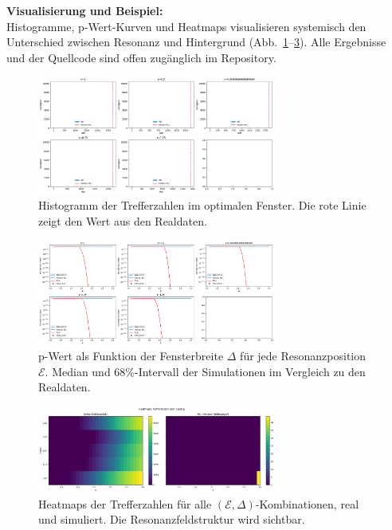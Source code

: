 \documentclass[12pt]{iopart}
\providecommand{\mathcal}[1]{\mathscr{#1}}
\begin{document}
\textbf{Visualisierung und Beispiel:}\\
Histogramme, p-Wert-Kurven und Heatmaps visualisieren systemisch den Unterschied zwischen Resonanz und Hintergrund (Abb.~\ref{fig:mc_results_hist}–\ref{fig:mc_results_heatmap}). Alle Ergebnisse und der Quellcode sind offen zugänglich im Repository.

\begin{figure}[ht]
	\centering
	\includegraphics[width=0.7\textwidth]{figures/hist_mc_vs_real_hits.png}
	\caption{Histogramm der Trefferzahlen im optimalen Fenster. Die rote Linie zeigt den Wert aus den Realdaten.}
	\label{fig:mc_results_hist}
\end{figure}

\begin{figure}[ht]
	\centering
	\includegraphics[width=0.7\textwidth]{figures/pvalue_curves.png}
	\caption{p-Wert als Funktion der Fensterbreite $\Delta$ für jede Resonanzposition $\mathcal{E}$. Median und 68\%-Intervall der Simulationen im Vergleich zu den Realdaten.}
	\label{fig:mc_results_pvalue}
\end{figure}

\begin{figure}[ht]
	\centering
	\includegraphics[width=0.7\textwidth]{figures/heatmaps_hits.png}
	\caption{Heatmaps der Trefferzahlen für alle $(\mathcal{E}, \Delta)$-Kombinationen, real und simuliert. Die Resonanzfeldstruktur wird sichtbar.}
	\label{fig:mc_results_heatmap}
\end{figure}
\end{document}
